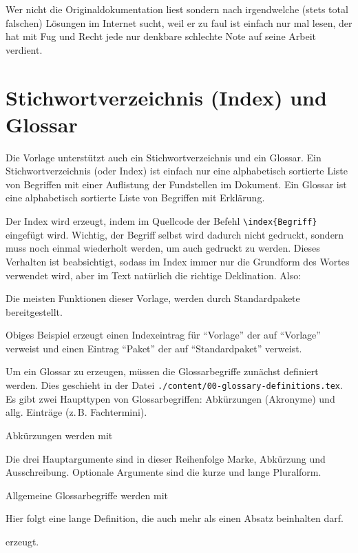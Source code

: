 Wer nicht die Originaldokumentation liest sondern nach irgendwelche (stets total
falschen) Lösungen im Internet sucht, weil er zu faul ist einfach nur mal lesen,
der hat mit Fug und Recht jede nur denkbare schlechte Note auf seine Arbeit
verdient.

\section{Stichwortverzeichnis (Index) und Glossar}

Die Vorlage unterstützt auch ein Stichwortverzeichnis und ein Glossar. Ein
Stichwortverzeichnis (oder Index) ist einfach nur eine alphabetisch sortierte
Liste von Begriffen mit einer Auflistung der Fundstellen
im Dokument. Ein Glossar ist eine alphabetisch sortierte Liste von Begriffen mit
Erklärung.

Der Index wird erzeugt, indem im Quellcode der Befehl \verb#\index{Begriff}#
eingefügt wird. Wichtig, der Begriff selbst wird dadurch nicht gedruckt, sondern
muss noch einmal wiederholt werden, um auch gedruckt zu werden. Dieses Verhalten
ist beabsichtigt, sodass im Index immer nur die Grundform des Wortes verwendet
wird, aber im Text natürlich die richtige Deklination. Also:
\begin{latex}[caption={Beispiel für Index},label={lst:index}]
Die meisten Funktionen dieser Vorlage, werden durch
Standardpakete bereitgestellt.
\end{latex}
Obiges Beispiel erzeugt einen Indexeintrag für \enquote{Vorlage} der auf
\enquote{Vorlage} verweist und einen Eintrag \enquote{Paket} der auf 
\enquote{Standardpaket} verweist.

Um ein Glossar zu erzeugen, müssen die Glossarbegriffe zunächst definiert werden.
Dies geschieht in der Datei \texttt{./content/00-glossary-definitions.tex}.
Es gibt zwei Haupttypen von Glossarbegriffen: Abkürzungen (Akronyme) und allg.
Einträge (z.\,B. Fachtermini).

Abkürzungen werden mit
\begin{latex}[caption={Definition von Abkürzungen},label={lst:acro}]
\end{latex}
Die drei Hauptargumente sind in dieser Reihenfolge Marke, Abkürzung und
Ausschreibung. Optionale Argumente sind die kurze und lange Pluralform.

Allgemeine Glossarbegriffe werden mit
\begin{latex}[caption={Definition von allg. Glossareinträgen},label={lst:gls}]
%
{%
  Hier folgt eine lange Definition, die auch mehr als einen
	Absatz beinhalten darf.
}
\end{latex}
erzeugt.

